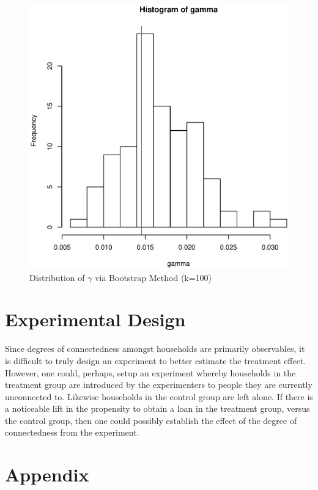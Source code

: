 \documentclass[11pt, fleqn]{article}
\begin{document}
\begin{figure}[!htb]
  \centering
  \includegraphics[scale=.5]{bootstrap_hist.eps}
  \caption{Distribution of $\gamma$ via Bootstrap Method (k=100)}
  \label{fig:bootstrap_hist}
\end{figure}

\section{Experimental Design}

Since degrees of connectedness amongst households are primarily observables, it is difficult to truly design an experiment to better estimate the treatment effect. However, one could, perhaps, setup an experiment whereby households in the treatment group are introduced by the experimenters to people they are currently unconnected to.  Likewise households in the control group are left alone.  If there is a noticeable lift in the propensity to obtain a loan in the treatment group, versus the control group, then one could possibly establish the effect of the degree of connectedness from the experiment.

\section{Appendix}
\end{document}
